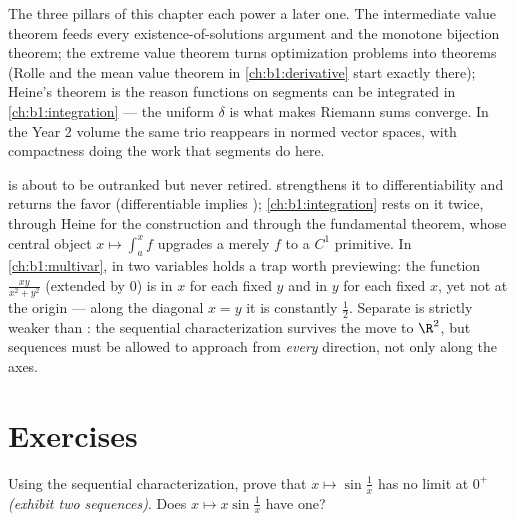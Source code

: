 \begin{remark}
The three pillars of this chapter each power a later one. The
intermediate value theorem feeds every existence-of-solutions
argument and the monotone bijection theorem; the extreme value
theorem turns optimization problems into theorems (Rolle and the
mean value theorem in \cref{ch:b1:derivative} start exactly
there); Heine's theorem is the reason  functions on
segments can be integrated in \cref{ch:b1:integration} --- the
uniform $\delta$ is what makes Riemann sums converge. In the Year
2 volume the same trio reappears in normed vector spaces, with
compactness doing the work that segments do here.
\end{remark}

\begin{remark}
 is about to be outranked but never retired.
 strengthens it to differentiability and
returns the favor (differentiable implies );
\cref{ch:b1:integration} rests on it twice, through Heine for
the construction and through the fundamental theorem, whose
central object $x \mapsto \int_a^x f$ upgrades a merely
 $f$ to a $C^1$ primitive. In
\cref{ch:b1:multivar},  in two variables holds a trap
worth previewing: the function $\frac{xy}{x^2 + y^2}$ (extended
by $0$) is  in $x$ for each fixed $y$ and in $y$ for
each fixed $x$, yet not  at the origin --- along the
diagonal $x = y$ it is constantly $\frac12$. Separate 
is strictly weaker than : the sequential
characterization survives the move to $\R^2$, but sequences must
be allowed to approach from \emph{every} direction, not only
along the axes.
\end{remark}

\section{Exercises}

\begin{exercise}[$\star$]\label{exo:b1:continuity:1}
Using the sequential characterization, prove that $x \mapsto
\sin\frac 1x$ has no limit at $0^+$ \emph{(exhibit two sequences)}.
Does $x \mapsto x \sin\frac 1x$ have one?
\end{exercise}

